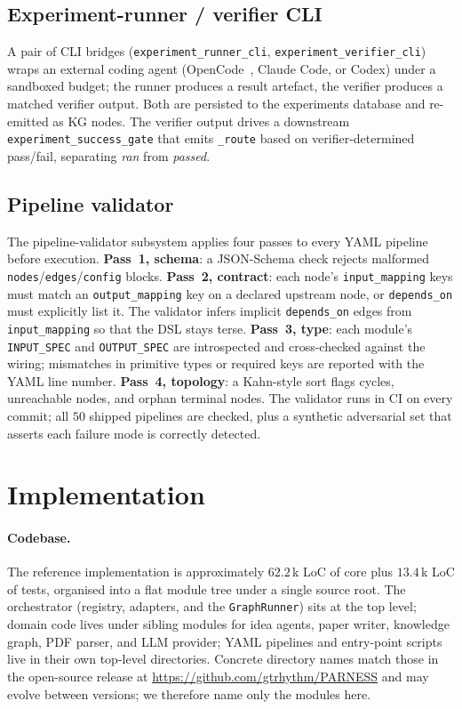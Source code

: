 \documentclass{article}
\newcommand{\code}[1]{\texttt{\small #1}}
\begin{document}
\subsection{Experiment-runner / verifier CLI}
\label{sec:expcli}
A pair of CLI bridges (\code{experiment\_runner\_cli},
\code{experiment\_verifier\_cli}) wraps an external coding agent
(OpenCode~\cite{opencodecli}, Claude Code, or Codex) under a sandboxed
budget; the runner produces a result artefact, the verifier produces a
matched verifier output. Both are persisted to the experiments database
and re-emitted as KG nodes. The verifier output drives a downstream
\code{experiment\_success\_gate} that emits \code{\_route} based on
verifier-determined pass/fail, separating \emph{ran} from \emph{passed}.

\subsection{Pipeline validator}
\label{sec:validation}
The pipeline-validator subsystem applies four passes to every YAML
pipeline before execution.
\textbf{Pass~1, schema}: a JSON-Schema check rejects malformed
\code{nodes}/\code{edges}/\code{config} blocks.
\textbf{Pass~2, contract}: each node's \code{input\_mapping} keys must
match an \code{output\_mapping} key on a declared upstream node, or
\code{depends\_on} must explicitly list it. The validator infers
implicit \code{depends\_on} edges from \code{input\_mapping} so that the
DSL stays terse.
\textbf{Pass~3, type}: each module's \code{INPUT\_SPEC} and
\code{OUTPUT\_SPEC} are introspected and cross-checked against the
wiring; mismatches in primitive types or required keys are reported
with the YAML line number.
\textbf{Pass~4, topology}: a Kahn-style sort flags cycles, unreachable
nodes, and orphan terminal nodes. The validator runs in CI on every
commit; all $50$ shipped pipelines are checked, plus a synthetic
adversarial set that asserts each failure mode is correctly detected.

\section{Implementation}
\label{sec:impl}

\paragraph{Codebase.}
The reference implementation is approximately $62.2$\,k LoC of core
plus $13.4$\,k LoC of tests, organised into a flat module tree under a
single source root. The orchestrator (registry, adapters, and the
\code{GraphRunner}) sits at the top level; domain code lives under
sibling modules for idea agents, paper writer, knowledge graph, PDF
parser, and LLM provider; YAML pipelines and entry-point scripts live
in their own top-level directories. Concrete directory names match
those in the open-source release at
\url{https://github.com/gtrhythm/PARNESS} and may evolve between
versions; we therefore name only the modules here.
\end{document}

